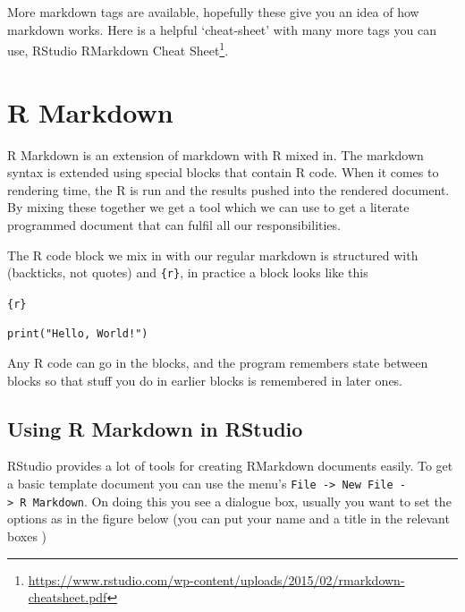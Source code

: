 \documentclass[
]{book}
\renewcommand{\href}[2]{#2\footnote{\url{#1}}}
\begin{document}
More markdown tags are available, hopefully these give you an idea of how markdown works. Here is a helpful `cheat-sheet' with many more tags you can use, \href{https://www.rstudio.com/wp-content/uploads/2015/02/rmarkdown-cheatsheet.pdf}{RStudio RMarkdown Cheat Sheet}.

\hypertarget{r-markdown}{%
\section{R Markdown}\label{r-markdown}}

R Markdown is an extension of markdown with R mixed in. The markdown syntax is extended using special blocks that contain R code. When it comes to rendering time, the R is run and the results pushed into the rendered document. By mixing these together we get a tool which we can use to get a literate programmed document that can fulfil all our responsibilities.

The R code block we mix in with our regular markdown is structured with \texttt{\textasciigrave{}\textasciigrave{}\textasciigrave{}} (backticks, not quotes) and \texttt{\{r\}}, in practice a block looks like this

\texttt{\textasciigrave{}\textasciigrave{}\textasciigrave{}\{r\}}

\texttt{print("Hello,\ World!")}

\texttt{\textasciigrave{}\textasciigrave{}\textasciigrave{}}

Any R code can go in the blocks, and the program remembers state between blocks so that stuff you do in earlier blocks is remembered in later ones.

\hypertarget{using-r-markdown-in-rstudio}{%
\subsection{Using R Markdown in RStudio}\label{using-r-markdown-in-rstudio}}

RStudio provides a lot of tools for creating RMarkdown documents easily. To get a basic template document you can use the menu's \texttt{File\ -\textgreater{}\ New\ File\ -\textgreater{}\ R\ Markdown}. On doing this you see a dialogue box, usually you want to set the options as in the figure below (you can put your name and a title in the relevant boxes )
\end{document}
